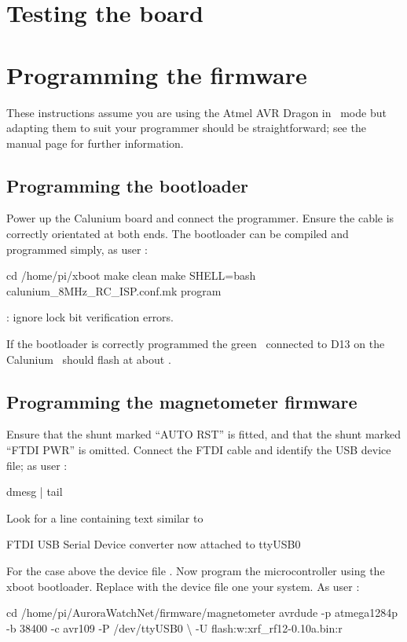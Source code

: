 \section{Testing the board}

\section{Programming the firmware}

These instructions assume you are using the Atmel AVR Dragon in \isp\
mode but adapting them to suit your programmer should be
straightforward; see the  manual page for further
information.

\subsection{Programming the bootloader}

Power up the Calunium board and connect the programmer. Ensure the
cable is correctly orientated at both ends. The bootloader can be
compiled and programmed simply, as user \piUser: \todo[Check directory]
\begin{Cmd}
  cd /home/pi/xboot
  make clean
  make SHELL=bash calunium_8MHz_RC_ISP.conf.mk program
\end{Cmd}
\todo: ignore lock bit verification errors.

If the bootloader is correctly programmed the green \led\ connected to
D13 on the Calunium \pcb\ should flash at about \Hz{1}.

\subsection{Programming the magnetometer firmware}
Ensure that the shunt marked ``AUTO RST'' is fitted, and that the
shunt marked ``FTDI PWR'' is omitted. Connect the FTDI cable and
identify the USB device file; as user \piUser:
\begin{Cmd}
  dmesg | tail
\end{Cmd}

Look for a line containing text similar to
\begin{Cmd}
  FTDI USB Serial Device converter now attached to ttyUSB0
\end{Cmd}
For the case above the device file . Now
program the microcontroller using the xboot bootloader. Replace
\filename{/dev/ttyUSB0} with the device file one your system. As user
\piUser:
\begin{Cmd}
  cd /home/pi/AuroraWatchNet/firmware/magnetometer
  avrdude -p atmega1284p -b 38400 -c avr109 -P /dev/ttyUSB0 \textbackslash
      -U flash:w:xrf_rf12-0.10a.bin:r
\end{Cmd}


